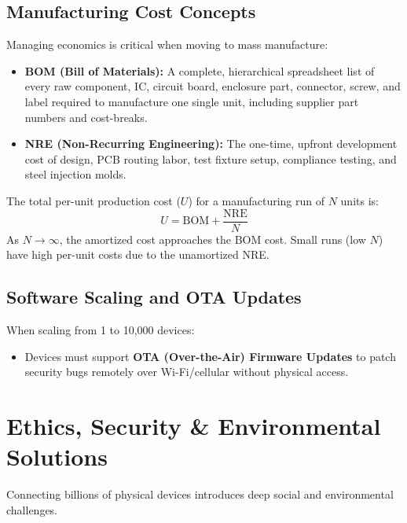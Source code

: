 \documentclass[12pt,a4paper]{article}
\begin{document}
\subsection{Manufacturing Cost Concepts}
Managing economics is critical when moving to mass manufacture:
\begin{itemize}[leftmargin=*, itemsep=3.5pt]
  \item \textbf{BOM (Bill of Materials):} A complete, hierarchical spreadsheet list of every raw component, IC, circuit board, enclosure part, connector, screw, and label required to manufacture one single unit, including supplier part numbers and cost-breaks.
  \item \textbf{NRE (Non-Recurring Engineering):} The one-time, upfront development cost of design, PCB routing labor, test fixture setup, compliance testing, and steel injection molds.
\end{itemize}
\begin{tcolorbox}[formulabox, title={Amortized Unit Cost Formula}]
  The total per-unit production cost ($U$) for a manufacturing run of $N$ units is:
  \begin{equation}
    U = \text{BOM} + \frac{\text{NRE}}{N}
  \end{equation}
  As $N \rightarrow \infty$, the amortized cost approaches the BOM cost. Small runs (low $N$) have high per-unit costs due to the unamortized NRE.
\end{tcolorbox}

\subsection{Software Scaling and OTA Updates}
When scaling from 1 to 10,000 devices:
\begin{itemize}[leftmargin=*, itemsep=2pt]
  \item Devices must support \textbf{OTA (Over-the-Air) Firmware Updates} to patch security bugs remotely over Wi-Fi/cellular without physical access.
\end{itemize}

\section{Ethics, Security \& Environmental Solutions}

Connecting billions of physical devices introduces deep social and environmental challenges.
\end{document}
